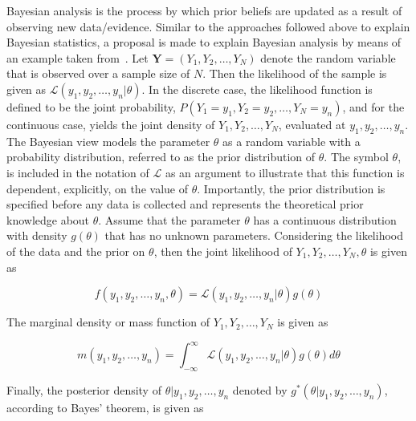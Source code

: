 Bayesian analysis is the process by which prior beliefs are updated as a result of observing new data/evidence. Similar to the approaches followed above to explain Bayesian statistics, a proposal is made to explain Bayesian analysis by means of an example taken from~\cite{ref:wackerly:2014}. Let $\boldsymbol{Y} = (Y_{1}, Y_{2}, \dots, Y_{N})$ denote the random variable that is observed over a sample size of $N$. Then the likelihood of the sample is given as $\mathcal{L}(y_{1}, y_{2}, \dots, y_{n} \vert \theta)$. In the discrete case, the likelihood function is defined to be the joint probability, $P(Y_{1} = y_{1}, Y_{2} = y_{2}, \dots, Y_{N} = y_{n})$, and for the continuous case, yields the joint density of $Y_{1}, Y_{2}, \dots, Y_{N}$, evaluated at $y_{1}, y_{2}, \dots, y_{n}$. The Bayesian view models the parameter $\theta$ as a random variable with a probability distribution, referred to as the prior distribution of $\theta$. The symbol $\theta$, is included in the notation of $\mathcal{L}$ as an argument to illustrate that this function is dependent, explicitly, on the value of $\theta$. Importantly, the prior distribution is specified before any data is collected and represents the theoretical prior knowledge about $\theta$. Assume that the parameter $\theta$ has a continuous distribution with density $g(\theta)$ that has no unknown parameters. Considering the likelihood of the data and the prior on $\theta$, then the joint likelihood of $Y_{1}, Y_{2}, \dots, Y_{N}, \theta$ is given as

\begin{equation}
      \label{eq:probability:bayesian_statistic:bayesian_analysis:joint_likelihood}
      f(y_{1}, y_{2}, \dots, y_{n}, \theta) = \mathcal{L}(y_{1}, y_{2}, \dots, y_{n} \vert \theta)g(\theta)
\end{equation}

The marginal density or mass function of $Y_{1}, Y_{2}, \dots, Y_{N}$ is given as

\begin{equation}
      \label{eq:probability:bayesian_statistic:bayesian_analysis:marginal_density}
      m(y_{1}, y_{2}, \dots, y_{n}) = \int_{-\infty}^{\infty} \mathcal{L}(y_{1}, y_{2}, \dots, y_{n} \vert \theta)g(\theta)d\theta
\end{equation}

Finally, the posterior density of $\theta \vert y_{1}, y_{2}, \dots, y_{n}$ denoted by $g^{*}(\theta \vert y_{1}, y_{2}, \dots, y_{n})$, according to Bayes' theorem, is given as


